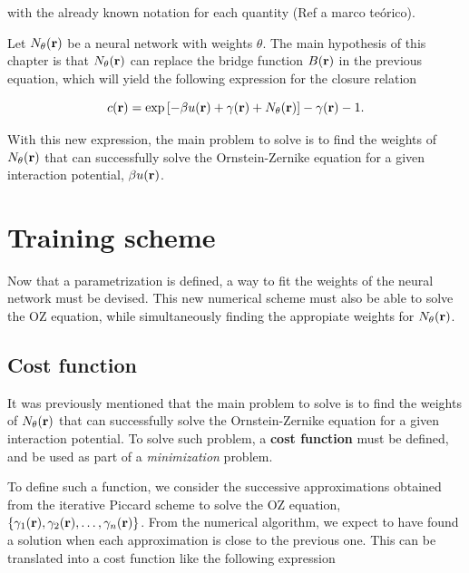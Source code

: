 with the already known notation for each quantity (Ref a marco teórico).

Let $N_{\theta}(\mathbf{r})$ be a neural network with weights $\theta$. The main hypothesis
of this chapter is that $N_{\theta}(\mathbf{r})$ can replace the bridge function $B(\mathbf{r})$
in the previous equation, which will yield the following expression for
the closure relation

\begin{equation}
    c(\mathbf{r}) = \exp{\left[
            -  \beta u(\mathbf{r})
            +  \gamma(\mathbf{r})
            + N_{\theta}(\mathbf{r})\right]} -
    \gamma(\mathbf{r})
    - 1 .
    \label{eq:parametrizacion}
\end{equation}

With this new expression, the main problem to solve is to find the weights
of $N_{\theta}(\mathbf{r})$ that can successfully solve the Ornstein-Zernike equation
for a given interaction potential, $\beta u(\mathbf{r})$.


\section{Training scheme}
Now that a parametrization is defined, a way to fit the weights of the neural network must
be devised. This new numerical scheme must also be able to solve the OZ equation, while
simultaneously finding the appropiate weights for $N_{\theta}(\mathbf{r})$.

\subsection{Cost function}
It was previously mentioned that the main problem to solve is to find the weights of
$N_{\theta}(\mathbf{r})$ that can successfully solve the Ornstein-Zernike equation
for a given interaction potential.
To solve such problem, a \textbf{cost function} must be defined, and be used as part of
a \emph{minimization} problem.

To define such a function, we consider the successive approximations obtained from the
iterative Piccard scheme to solve the OZ equation, $\{\gamma_1(\mathbf{r}), \gamma_2(\mathbf{r}), \dots, \gamma_n(\mathbf{r})\}$.
From the numerical algorithm, we expect to have found a solution when each approximation
is close to the previous one. This can be translated into a cost function like the
following expression

